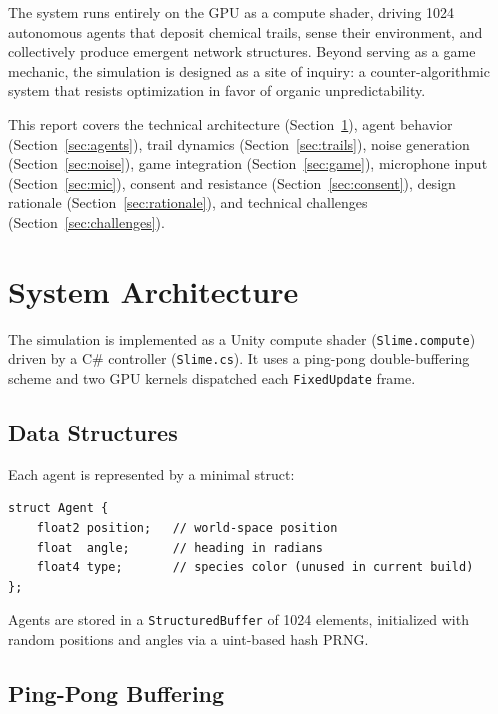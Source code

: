 \documentclass[12pt, titlepage]{article}
\begin{document}
The system runs entirely on the GPU as a compute shader, driving 1024
autonomous agents that deposit chemical trails, sense their environment, and
collectively produce emergent network structures. Beyond serving as a game
mechanic, the simulation is designed as a site of inquiry: a counter-algorithmic
system \cite{bunton2025} that resists optimization in favor of organic
unpredictability.

This report covers the technical architecture (Section~\ref{sec:arch}), agent
behavior (Section~\ref{sec:agents}), trail dynamics
(Section~\ref{sec:trails}), noise generation (Section~\ref{sec:noise}), game
integration (Section~\ref{sec:game}), microphone input
(Section~\ref{sec:mic}), consent and resistance (Section~\ref{sec:consent}),
design rationale (Section~\ref{sec:rationale}), and technical challenges
(Section~\ref{sec:challenges}).

\section{System Architecture}
\label{sec:arch}

The simulation is implemented as a Unity compute shader
(\texttt{Slime.compute}) driven by a C\# controller (\texttt{Slime.cs}). It
uses a ping-pong double-buffering scheme and two GPU kernels dispatched each
\texttt{FixedUpdate} frame.

\subsection{Data Structures}

Each agent is represented by a minimal struct:

\begin{lstlisting}
struct Agent {
    float2 position;   // world-space position
    float  angle;      // heading in radians
    float4 type;       // species color (unused in current build)
};
\end{lstlisting}

Agents are stored in a \texttt{StructuredBuffer} of 1024 elements, initialized
with random positions and angles via a uint-based hash PRNG.

\subsection{Ping-Pong Buffering}
\end{document}
